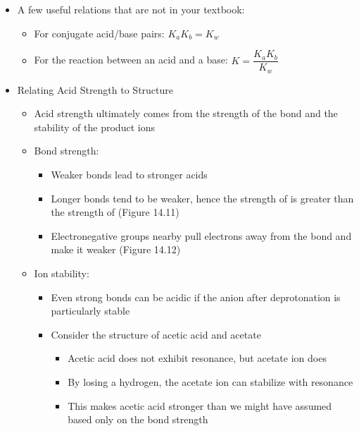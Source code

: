\documentclass[12pt, openany, letterpaper]{memoir}
\begin{document}
\begin{itemize}
	\item A few useful relations that are not in your textbook:
	\begin{itemize}
		\item For conjugate acid/base pairs: $K_aK_b=K_w$
		\item For the reaction between an acid and a base: $K=\dfrac{K_aK_b}{K_w}$
	\end{itemize}
  \item Relating Acid Strength to Structure
  \begin{itemize}
    \item Acid strength ultimately comes from the strength of the  bond and the stability of the product ions
    \item Bond strength:
    \begin{itemize}
      \item Weaker  bonds lead to stronger acids
      \item Longer bonds tend to be weaker, hence the strength of  is greater than the strength of  (Figure 14.11)
      \item Electronegative groups nearby pull electrons away from the  bond and make it weaker (Figure 14.12)
    \end{itemize}
    \item Ion stability:
    \begin{itemize}
      \item Even strong  bonds can be acidic if the anion after deprotonation is particularly stable
      \item Consider the structure of acetic acid and acetate
      \begin{itemize}
        \item Acetic acid does not exhibit resonance, but acetate ion does
        \item By losing a hydrogen, the acetate ion can stabilize with resonance
        \item This makes acetic acid stronger than we might have assumed based only on the  bond strength
      \end{itemize}
    \end{itemize}
  \end{itemize}
\end{itemize}
\end{document}
